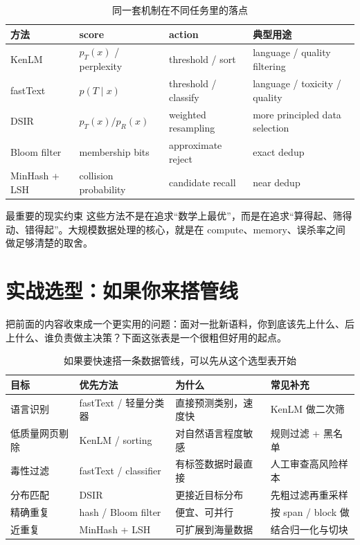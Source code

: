 \documentclass[a4paper]{article}
\begin{document}
\begin{table}[H]
\centering
\small
\renewcommand{\arraystretch}{1.15}
\begin{tabular}{p{2.2cm}p{4.1cm}p{4.0cm}p{3.3cm}}
\toprule
\textbf{方法} & \textbf{score} & \textbf{action} & \textbf{典型用途} \\
\midrule
KenLM & $p_T(x)$ / perplexity & threshold / sort & language / quality filtering \\
fastText & $p(T\mid x)$ & threshold / classify & language / toxicity / quality \\
DSIR & $p_T(x)/p_R(x)$ & weighted resampling & more principled data selection \\
Bloom filter & membership bits & approximate reject & exact dedup \\
MinHash + LSH & collision probability & candidate recall & near dedup \\
\bottomrule
\end{tabular}
\caption{同一套机制在不同任务里的落点}
\end{table}

\begin{warningbox}{最重要的现实约束}
这些方法不是在追求“数学上最优”，而是在追求“算得起、筛得动、错得起”。大规模数据处理的核心，就是在 compute、memory、误杀率之间做足够清楚的取舍。
\end{warningbox}

\section{实战选型：如果你来搭管线}

把前面的内容收束成一个更实用的问题：面对一批新语料，你到底该先上什么、后上什么、谁负责做主决策？下面这张表是一个很粗但好用的起点。

\begin{table}[H]
\centering
\small
\renewcommand{\arraystretch}{1.2}
\begin{tabular}{p{2.7cm}p{4.0cm}p{4.0cm}p{3.2cm}}
\toprule
\textbf{目标} & \textbf{优先方法} & \textbf{为什么} & \textbf{常见补充} \\
\midrule
语言识别 & fastText / 轻量分类器 & 直接预测类别，速度快 & KenLM 做二次筛 \\
低质量网页剔除 & KenLM / sorting & 对自然语言程度敏感 & 规则过滤 + 黑名单 \\
毒性过滤 & fastText / classifier & 有标签数据时最直接 & 人工审查高风险样本 \\
分布匹配 & DSIR & 更接近目标分布 & 先粗过滤再重采样 \\
精确重复 & hash / Bloom filter & 便宜、可并行 & 按 span / block 做 \\
近重复 & MinHash + LSH & 可扩展到海量数据 & 结合归一化与切块 \\
\bottomrule
\end{tabular}
\caption{如果要快速搭一条数据管线，可以先从这个选型表开始}
\end{table}
\end{document}
